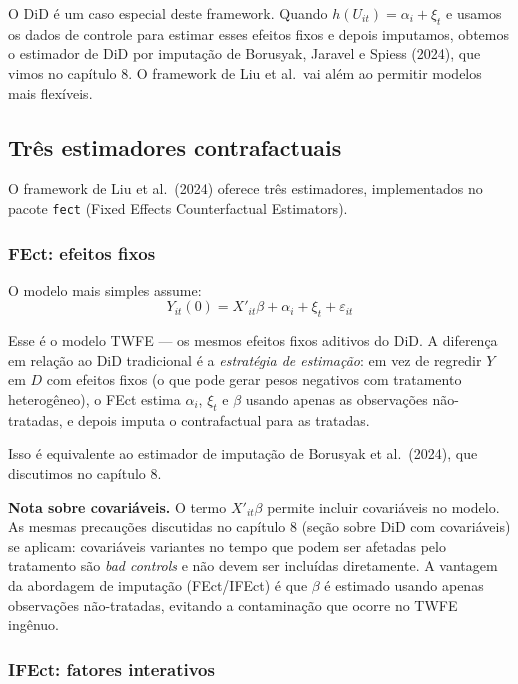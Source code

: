 \documentclass[
]{article}
\begin{document}
O DiD é um caso especial deste framework. Quando \(h(U_{it}) = \alpha_i + \xi_t\) e usamos os dados de controle para estimar esses efeitos fixos e depois imputamos, obtemos o estimador de DiD por imputação de Borusyak, Jaravel e Spiess (2024), que vimos no capítulo 8. O framework de Liu et al.~vai além ao permitir modelos mais flexíveis.

\subsection{Três estimadores contrafactuais}\label{truxeas-estimadores-contrafactuais}

O framework de Liu et al.~(2024) oferece três estimadores, implementados no pacote \texttt{fect} (Fixed Effects Counterfactual Estimators).

\subsubsection{FEct: efeitos fixos}\label{fect-efeitos-fixos}

O modelo mais simples assume:
\[
Y_{it}(0) = X'_{it}\beta + \alpha_i + \xi_t + \varepsilon_{it}
\]

Esse é o modelo TWFE --- os mesmos efeitos fixos aditivos do DiD. A diferença em relação ao DiD tradicional é a \emph{estratégia de estimação}: em vez de regredir \(Y\) em \(D\) com efeitos fixos (o que pode gerar pesos negativos com tratamento heterogêneo), o FEct estima \(\alpha_i\), \(\xi_t\) e \(\beta\) usando apenas as observações não-tratadas, e depois imputa o contrafactual para as tratadas.

Isso é equivalente ao estimador de imputação de Borusyak et al.~(2024), que discutimos no capítulo 8.

\textbf{Nota sobre covariáveis.} O termo \(X'_{it}\beta\) permite incluir covariáveis no modelo. As mesmas precauções discutidas no capítulo 8 (seção sobre DiD com covariáveis) se aplicam: covariáveis variantes no tempo que podem ser afetadas pelo tratamento são \emph{bad controls} e não devem ser incluídas diretamente. A vantagem da abordagem de imputação (FEct/IFEct) é que \(\beta\) é estimado usando apenas observações não-tratadas, evitando a contaminação que ocorre no TWFE ingênuo.

\subsubsection{IFEct: fatores interativos}\label{ifect-fatores-interativos}
\end{document}

